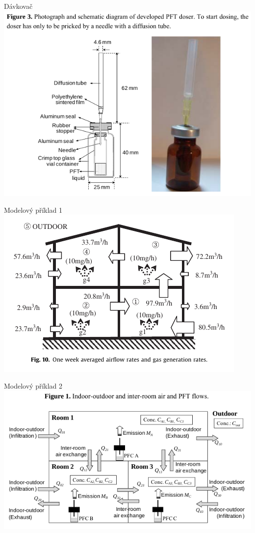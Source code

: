\documentclass[10pt]{beamer}
\begin{document}
\begin{frame}{Dávkovač}
    \small
    \centering
        \includegraphics[width=.7\textwidth]{davkovac.png}
        \cite{japonci2}       
\end{frame}

\begin{frame}{Modelový příklad 1}
        \centering
        \includegraphics[width=.9\textwidth]{zony.png}
        \cite{japonci}       
\end{frame}

\begin{frame}{Modelový příklad 2}
        \centering
        \includegraphics[width=.9\textwidth]{zony2.png}
        \cite{japonci2}       
\end{frame}
\end{document}
